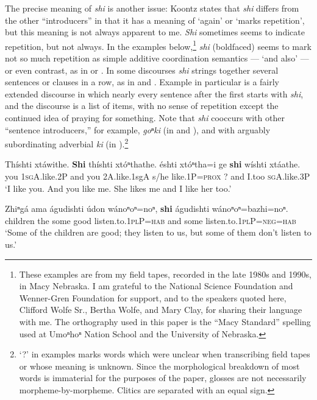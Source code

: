 \documentclass[output=paper]{LSP/langsci}
\begin{document}
The precise meaning of \textit{shi} is another issue:  Koontz states that \textit{shi} differs from the other ``introducers'' in that it has a meaning of `again' or `marks repetition', but this meaning is not always apparent to me. \textit{Shi} sometimes seems to indicate repetition, but not always.  In the examples below,\footnote{These examples are from my field tapes, recorded in the late 1980s and 1990s, in Macy Nebraska. I am grateful to the National Science Foundation and Wenner-Gren Foundation for support, and to the speakers quoted here, Clifford Wolfe Sr., Bertha Wolfe, and Mary Clay, for sharing their language with me. The orthography used in this paper is the ``Macy Standard'' spelling used at Umoⁿhoⁿ Nation School and the University of Nebraska.}   \textit{shi} (boldfaced) seems to mark not so much repetition as simple additive coordination semantics --- `and also' --- or even contrast, as in  or .  In some discourses \textit{shi} strings together several sentences or clauses in a row, as in  and .  Example  in particular is a fairly extended discourse in which nearly every sentence after the first starts with \textit{shi}, and the discourse is a list of items, with no sense of repetition except the continued idea of praying for something. Note that \textit{shi} cooccurs with other ``sentence introducers,'' for example, \textit{goⁿki} (in  and ), and with arguably subordinating adverbial \textit{ki} (in ).\footnote{`?' in examples marks words which were unclear when transcribing field tapes or whose meaning is unknown. Since the morphological breakdown of most words is immaterial for the purposes of the paper, glosses are not necessarily morpheme-by-morpheme. Clitics are separated with an equal sign.}

\ea \label{ex:rudin:7}
\gll Thíshti  xtáwithe.  \textbf{Shi} thíshti xtóⁿthathe.  éshti  xtóⁿtha=i  ge \textbf{shi}  wíshti xtáathe.\\
 	you   	\textsc{1sgA}.like.2P  and 	you     	2A.like.{1sgA}  	s/he   	like.1P=\textsc{prox}  	?  	and  	I.too  	\textsc{sgA}.like.3P\\
\trans `I like you.  And you like me.  She likes me and I like her too.'

\ex\label{ex:rudin:8} 
\gll  Zhiⁿgá  ama águdishti údon  wánoⁿoⁿ=noⁿ, \textbf{shi}  águdishti  wánoⁿoⁿ=bazhi=noⁿ.\\
children 	the 	some        	good  	listen.to.\textsc{1plP=hab} 	and some listen.to.\textsc{1plP}=\textsc{neg=hab}\\
\trans `Some of the children are good; they listen to us, but some of them don't listen to us.'
\end{document}
